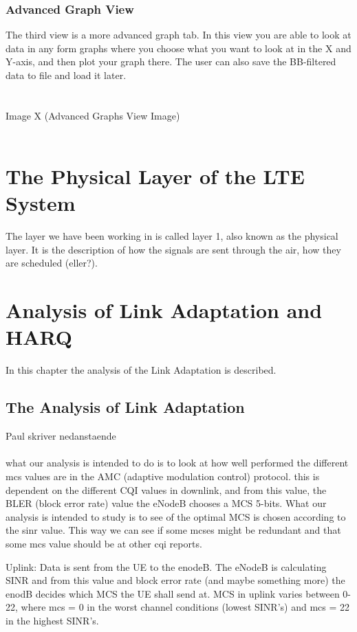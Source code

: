 \documentclass[cropmarks, frame, english]{idamasterthesis}
\begin{document}
\subsection{Advanced Graph View}
The third view is a more advanced graph tab. In this view you are able to look at data in any form graphs where you choose what you want to look at in the X and Y-axis, and then plot your graph there. The user can also save the BB-filtered data to file and load it later. 
\\
\\
\\ 
		Image X (Advanced Graphs View Image)
\\
\\




\chapter{The Physical Layer of the LTE System}
The layer we have been working in is called layer 1, also known as the physical layer. It is the description of how the signals are sent through the air, how they are scheduled (eller?).
 
 
 
 
\chapter{Analysis of Link Adaptation and HARQ}
In this chapter the analysis of the Link Adaptation is described. 

\section{The Analysis of Link Adaptation}
Paul skriver nedanstaende \\ \\
what our analysis is intended to do is to look at how well performed the different mcs values are in the AMC (adaptive modulation control) protocol. this is dependent on the different CQI values in downlink, and from this value, the BLER (block error rate) value the eNodeB chooses a MCS 5-bits. What our analysis is intended to study is to see of the optimal MCS is chosen according to the sinr value. This way we can see if some mcses might be redundant and that some mcs value should be at other cqi reports. 

Uplink: \newline
Data is sent from the UE to the enodeB. The eNodeB is calculating SINR and from this value and block error rate (and maybe something more) the enodB decides which MCS the UE shall send at. MCS in uplink varies between 0-22, where mcs = 0 in the worst channel conditions (lowest SINR's) and mcs = 22 in the highest SINR's. 
\end{document}
